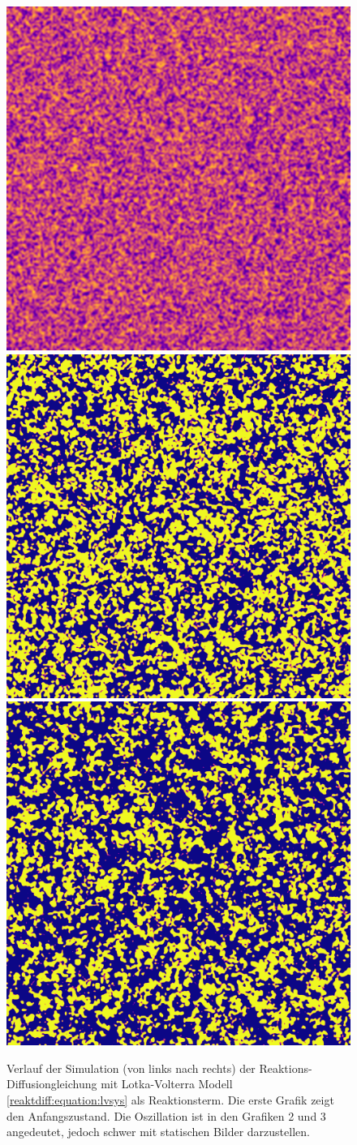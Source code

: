 \begin{figure}
    \centering
    \includegraphics[width=0.32\linewidth]{papers/reaktdiff/images/LotkaVolterra/lv_n1.png}
    \includegraphics[width=0.32\linewidth]{papers/reaktdiff/images/LotkaVolterra/lv_n300.png}
    \includegraphics[width=0.32\linewidth]{papers/reaktdiff/images/LotkaVolterra/lv_n999.png}
    \caption{Verlauf der Simulation (von links nach rechts) der Reaktions-Diffusiongleichung mit Lotka-Volterra Modell \eqref{reaktdiff:equation:lvsys}
     als Reaktionsterm. Die erste Grafik zeigt den Anfangszustand. Die Oszillation ist in den Grafiken 2 und 3 angedeutet, jedoch schwer mit statischen Bilder darzustellen.}
    \label{reaktdiff:fig:lv}
\end{figure}
